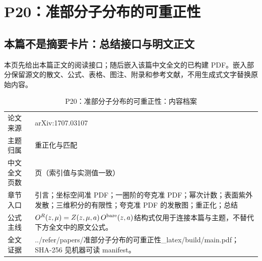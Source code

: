 \documentclass[UTF8,11pt,oneside]{ctexbook}
\begin{document}
\chapter{P20：准部分子分布的可重正性}
\section*{本篇不是摘要卡片：总结接口与明文正文}
本页先给出本篇正文的阅读接口；随后嵌入该篇中文全文的已构建 PDF。嵌入部分保留源文的散文、公式、表格、图注、附录和参考文献，不用生成式文字替换原始内容。
\begin{table}[htbp]
  \centering
  \caption{P20：准部分子分布的可重正性：内容档案}
  \small
  \begin{tabularx}{0.96\textwidth}{@{}p{3.3cm}>{\raggedright\arraybackslash}X@{}}
    \toprule
    论文来源 & arXiv:1707.03107 \\
    主题归属 & 重正化与匹配 \\
    中文全文页数 & 15 页（索引值与实测值一致） \\
    章节入口 & 引言；坐标空间准 PDF；一圈阶的夸克准 PDF；幂次计数；表面紫外发散；三维积分的有限性；夸克准 PDF 的发散图；重正化；总结 \\
    公式主线 & $O^{R}(z,\mu)=Z(z,\mu,a)\,O^{\rm bare}(z,a)$\newline\scriptsize 结构式仅用于连接本篇与主题，不替代下方全文中的原文公式。 \\
    全文证据 & ../\allowbreak{}refer/\allowbreak{}papers/\allowbreak{}准部分子分布的可重正性\_\allowbreak{}latex/\allowbreak{}build/\allowbreak{}main.pdf；SHA-256 见机器可读 manifest。 \\
    \bottomrule
  \end{tabularx}
\end{table}
\end{document}
